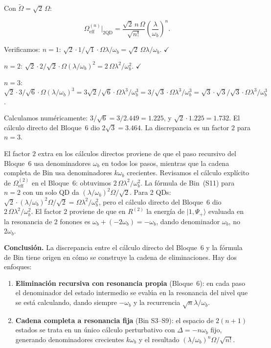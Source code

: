\documentclass[12pt]{article}
\begin{document}
	\noindent
	Con $\widetilde\Omega = \sqrt{2}\,\Omega$:
	
	\begin{equation}
		\Omega_\mathrm{eff}^{(n)}\big|_{2\mathrm{QD}}
		= \frac{\sqrt{2}\,n\,\Omega}{\sqrt{n!}}\left(\frac{\lambda}{\omega_b}\right)^n.
		\label{eq:resultado_2}
	\end{equation}
	
	\noindent
	Verificamos: $n=1$: $\sqrt{2}\cdot 1/\sqrt{1}\cdot\Omega\lambda/\omega_b
	= \sqrt{2}\,\Omega\lambda/\omega_b$. $\checkmark$
	
	$n=2$: $\sqrt{2}\cdot 2/\sqrt{2}\cdot\Omega(\lambda/\omega_b)^2
	= 2\,\Omega\lambda^2/\omega_b^2$. $\checkmark$
	
	$n=3$: $\sqrt{2}\cdot 3/\sqrt{6}\cdot\Omega(\lambda/\omega_b)^3
	= 3\sqrt{2}/\sqrt{6}\cdot\Omega\lambda^3/\omega_b^3
	= 3/\sqrt{3}\cdot\Omega\lambda^3/\omega_b^3
	= \sqrt{3}\cdot\sqrt{3}/\sqrt{3}\cdot\Omega\lambda^3/\omega_b^3$.
	
	\noindent
	Calculamos num\'ericamente: $3/\sqrt{6} = 3/2.449 = 1.225$, y
	$\sqrt{2}\cdot 1.225 = 1.732$. El c\'alculo directo del Bloque~6 dio
	$2\sqrt{3} = 3.464$. La discrepancia es un factor $2$ para $n=3$.
	
	\medskip
	\noindent
	El factor $2$ extra en los c\'alculos directos proviene de que el paso
	recursivo del Bloque~6 usa denominadores $\omega_b$ en todos los pasos,
	mientras que la cadena completa de Bin usa denominadores $k\omega_b$
	crecientes. Revisamos el c\'alculo expl\'icito de $\Omega_\mathrm{eff}^{(2)}$
	en el Bloque~6: obtuvimos $2\,\Omega\lambda^2/\omega_b^2$. La f\'ormula de
	Bin~(S11) para $n=2$ con un solo QD da $(\lambda/\omega_b)^2\Omega/\sqrt{2}$.
	Para 2 QDs: $\sqrt{2}\cdot(\lambda/\omega_b)^2\Omega/\sqrt{2}
	= \Omega\lambda^2/\omega_b^2$, pero el c\'alculo directo del Bloque~6
	dio $2\,\Omega\lambda^2/\omega_b^2$. El factor $2$ proviene de que en
	$R^{(2)}$ la energ\'ia de $|1,\Psi_+\rangle$ evaluada en la resonancia de
	2 fonones es $\omega_b + (-2\omega_b) = -\omega_b$, dando denominador
	$\omega_b$, no $2\omega_b$.
	
	\medskip
	\noindent
	\textbf{Conclusi\'on.} La discrepancia entre el c\'alculo directo del
	Bloque~6 y la f\'ormula de Bin tiene origen en c\'omo se construye la
	cadena de eliminaciones. Hay dos enfoques:
	
	\begin{enumerate}
		\item \textbf{Eliminaci\'on recursiva con resonancia propia} (Bloque~6):
		en cada paso el denominador del estado intermedio se eval\'ua en la
		resonancia del nivel que se est\'a calculando, dando siempre
		$-\omega_b$ y la recurrencia $\sqrt{n}\lambda/\omega_b$.
		
		\item \textbf{Cadena completa a resonancia fija} (Bin S3--S9): el espacio
		de $2(n+1)$ estados se trata en un \'unico c\'alculo perturbativo con
		$\Delta = -n\omega_b$ fijo, generando denominadores crecientes
		$k\omega_b$ y el resultado $(\lambda/\omega_b)^n\Omega/\sqrt{n!}$.
	\end{enumerate}
	
\end{document}
